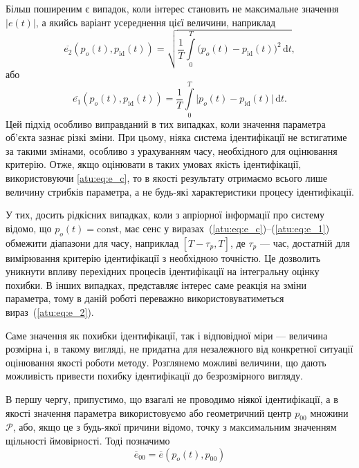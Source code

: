 Більш поширеним є випадок, коли інтерес становить не максимальне значення
$|e(t)|$, а якийсь варіант усереднення цієї величини, наприклад
%
\begin{equation}
  \overline{e_2}(p_o(t),p_\mathrm{id}(t))
  =
  \sqrt{ \frac{1}{T} \int\limits_{0}^{T} \big( p_o(t)-p_\mathrm{id}(t) \big)^2 \, \mathrm{d}t },
  \label{atu:eq:e_2}
\end{equation}
%
або
\begin{equation}
  \overline{e_1}(p_o(t),p_\mathrm{id}(t))
  =
  \frac{1}{T} \int\limits_{0}^{T} \big| p_o(t)-p_\mathrm{id}(t) \big| \, \mathrm{d}t .
  \label{atu:eq:e_1}
\end{equation}
%
Цей підхід особливо виправданий в тих випадках, коли значення
параметра об'єкта зазнає різкі зміни. При цьому, ніяка система
ідентифікації не встигатиме за такими змінами, особливо з
урахуванням часу, необхідного для оцінювання критерію. Отже,
якщо оцінювати в таких умовах якість ідентифікації,
використовуючи \ref{atu:eq:e_c}, то в якості результату отримаємо
всього лише величину стрибків параметра, а не будь-які
характеристики процесу ідентифікації.

У тих, досить рідкісних випадках, коли з апріорної інформації
про систему відомо, що
$ p_o (t) = \mathrm{const} $, має сенс у виразах~(\ref{atu:eq:e_c})--(\ref{atu:eq:e_1})
обмежити діапазони для часу, наприклад
$ [T- \tau_p, T] $, де
$ \tau_p $ --- час, достатній для вимірювання критерію ідентифікації з
необхідною точністю. Це дозволить уникнути впливу перехідних
процесів ідентифікації на інтегральну оцінку похибки. В
інших випадках, представляє інтерес саме реакція на зміни
параметра, тому в даній роботі переважно використовуватиметься
вираз~(\ref{atu:eq:e_2}).



Саме значення як похибки ідентифікації, так і відповідної міри ---
величина розмірна і, в такому вигляді, не придатна для незалежного від
конкретної ситуації оцінювання якості роботи методу. Розглянемо можливі
величини, що дають можливість привести похибку ідентифікації до безрозмірного
вигляду.

В першу чергу, припустимо, що взагалі не проводимо ніякої
ідентифікації, а в якості значення параметра використовуємо або геометричний
центр $p_{00}$ множини $\mathcal{P}$, або, якщо це з будь-якої причини
відомо, точку з максимальним значенням щільності ймовірності. Тоді позначимо
%
\begin{equation}
  \overline{e}_{00}
  =
  \overline{e}(p_o(t),p_{00})
  \label{atu:eq:e_00}
\end{equation}

